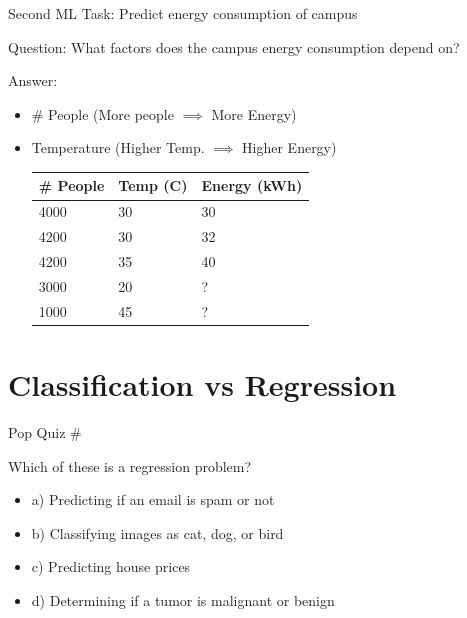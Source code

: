 \documentclass[usenames,dvipsnames]{beamer}
\begin{document}
\begin{frame}{Second ML Task: Predict energy consumption of campus}

Question: What factors does the campus energy consumption depend on?

Answer:\begin{itemize}
	\item \pause \# People (More people $\implies$ More Energy)
	\item \pause Temperature (Higher Temp. $\implies$ Higher Energy)

\pause \begin{table}[]
	\begin{tabular}{|l|l||l|}
		\hline 
		
		\textbf{\# People} & \textbf{Temp (C)} &  \textbf{Energy (kWh)} \\ \hline 
		
		4000 & 30 & 30 \\
		4200 & 30 & 32 \\
		4200 & 35 & 40 \\ \hline
		3000 & 20& ? \\
		1000 & 45 & ? \\ \hline          
	\end{tabular}
\end{table}	
\end{itemize}

\end{frame}





\section{Classification vs Regression}

\begin{frame}{Pop Quiz \#\thepopquiz}
\begin{popquizbox}{\thepopquiz}
Which of these is a regression problem?
\begin{itemize}
	\item a) Predicting if an email is spam or not
	\item b) Classifying images as cat, dog, or bird
	\item c) Predicting house prices
	\item d) Determining if a tumor is malignant or benign
\end{itemize}
\end{popquizbox}
\end{frame}
\end{document}
